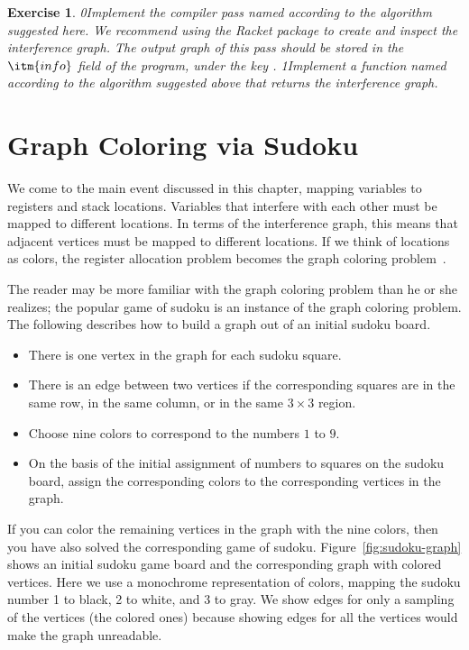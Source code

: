 \documentclass[7x10]{TimesAPriori_MIT}%
\def\racketEd{0}
\def\pythonEd{1}
\def\edition{0}
\newcommand{\racket}[1]{{\if\edition\racketEd{#1}\fi}}
\newcommand{\python}[1]{{\if\edition\pythonEd #1\fi}}
\newtheorem{exercise}[theorem]{Exercise}
\numberwithin{theorem}{chapter}
\numberwithin{definition}{chapter}
\numberwithin{equation}{chapter}
\begin{document}
\begin{exercise}\normalfont\normalsize
\racket{Implement the compiler pass named \code{build\_interference} according
to the algorithm suggested here. We recommend using the Racket
  \code{graph} package to create and inspect the interference graph.
The output graph of this pass should be stored in the $\itm{info}$ field of
the program, under the key \code{conflicts}.}
%
\python{Implement a function named 
  according to the algorithm suggested above that
  returns the interference graph.}
\end{exercise}

  
\section{Graph Coloring via Sudoku}
\label{sec:graph-coloring}

We come to the main event discussed in this chapter, mapping variables
to registers and stack locations. Variables that interfere with each
other must be mapped to different locations.  In terms of the
interference graph, this means that adjacent vertices must be mapped
to different locations.  If we think of locations as colors, the
register allocation problem becomes the graph coloring
problem~\citep{Balakrishnan:1996ve,Rosen:2002bh}.

The reader may be more familiar with the graph coloring problem than he
or she realizes; the popular game of sudoku is an instance of the
graph coloring problem. The following describes how to build a graph
out of an initial sudoku board.
\begin{itemize}
\item There is one vertex in the graph for each sudoku square.
\item There is an edge between two vertices if the corresponding squares
  are in the same row, in the same column, or in the same $3\times 3$ region.
\item Choose nine colors to correspond to the numbers $1$ to $9$.
\item On the basis of the initial assignment of numbers to squares on the
  sudoku board, assign the corresponding colors to the corresponding
  vertices in the graph.
\end{itemize}
If you can color the remaining vertices in the graph with the nine
colors, then you have also solved the corresponding game of sudoku.
Figure~\ref{fig:sudoku-graph} shows an initial sudoku game board and
the corresponding graph with colored vertices.  Here we use a
monochrome representation of colors, mapping the sudoku number 1 to
black, 2 to white, and 3 to gray.  We show edges for only a sampling
of the vertices (the colored ones) because showing edges for all the
vertices would make the graph unreadable.
\end{document}
